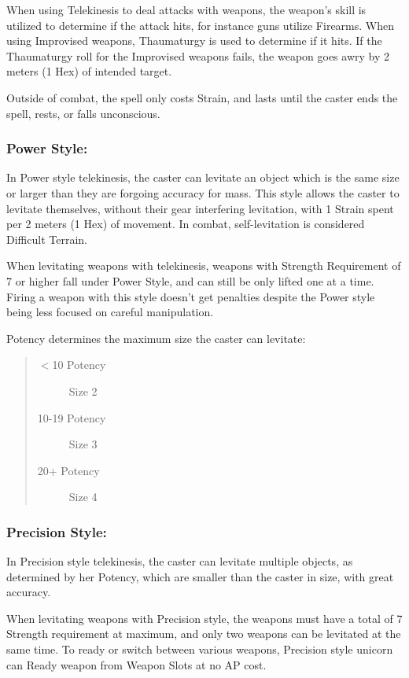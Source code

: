 \documentclass[11pt,a4paper,twocolumn]{book}
\begin{document}
When using Telekinesis to deal attacks with weapons, the weapon's skill is utilized to determine if the attack hits, for instance guns utilize Firearms. When using Improvised weapons, Thaumaturgy is used to determine if it hits. If the Thaumaturgy roll for the Improvised weapons fails, the weapon goes awry by 2 meters (1 Hex) of intended target.

Outside of combat, the spell only costs Strain, and lasts until the caster ends the spell, rests, or falls unconscious. 

\subsubsection*{Power Style:}

In Power style telekinesis, the caster can levitate an object which is the same size or larger than they are forgoing accuracy for mass. This style allows the caster to levitate themselves, without their gear interfering levitation, with 1 Strain spent per 2 meters (1 Hex) of movement. In combat, self-levitation is considered Difficult Terrain.

When levitating weapons with telekinesis, weapons with Strength Requirement of 7 or higher fall under Power Style, and can still be only lifted one at a time. Firing a weapon with this style doesn't get penalties despite the Power style being less focused on careful manipulation.

Potency determines the maximum size the caster can levitate:

\begin{quote}
	\begin{description}
		\item[$<$10 Potency] 	Size 2
		\item[10-19 Potency] 	Size 3
		\item[20+ Potency] 		Size 4
	\end{description}	
\end{quote}

\subsubsection*{Precision Style:}

In Precision style telekinesis, the caster can levitate multiple objects, as determined by her Potency, which are smaller than the caster in size, with great accuracy.

When levitating weapons with Precision style, the weapons must have a total of 7 Strength requirement at maximum, and only two weapons can be levitated at the same time. To ready or switch between various weapons, Precision style unicorn can Ready weapon from Weapon Slots at no AP cost. 
\end{document}
